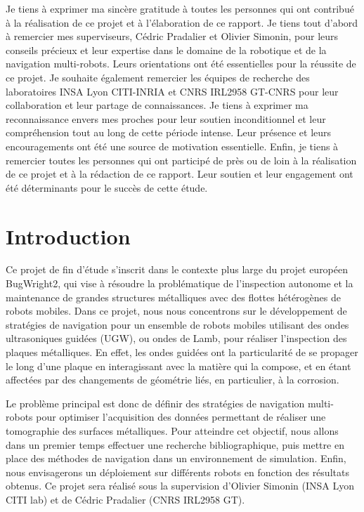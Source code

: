 \documentclass[francais,RandD]{rapportPFE}
\begin{document}
	\begin{remerciements}
		Je tiens à exprimer ma sincère gratitude à toutes les personnes qui ont contribué à la réalisation de ce projet et à l'élaboration de ce rapport.
		Je tiens tout d'abord à remercier mes superviseurs, Cédric Pradalier et Olivier Simonin, pour leurs conseils précieux et leur expertise dans le domaine de la robotique et de la navigation multi-robots. Leurs orientations ont été essentielles pour la réussite de ce projet.
		Je souhaite également remercier les équipes de recherche des laboratoires INSA Lyon CITI-INRIA et CNRS IRL2958 GT-CNRS pour leur collaboration et leur partage de connaissances.
		Je tiens à exprimer ma reconnaissance envers mes proches pour leur soutien inconditionnel et leur compréhension tout au long de cette période intense.
		Leur présence et leurs encouragements ont été une source de motivation essentielle.
		Enfin, je tiens à remercier toutes les personnes qui ont participé de près ou de loin à la réalisation de ce projet et à la rédaction de ce rapport.
		Leur soutien et leur engagement ont été déterminants pour le succès de cette étude.
	\end{remerciements}
	\setcounter{tocdepth}{3}
	\tableofcontents
	\cleardoublepage
	\section{Introduction}
		Ce projet de fin d'étude s'inscrit dans le contexte plus large du projet européen BugWright2, qui vise à résoudre la problématique de l'inspection autonome et la maintenance de grandes structures métalliques avec des flottes hétérogènes de robots mobiles.
		Dans ce projet, nous nous concentrons sur le développement de stratégies de navigation pour un ensemble de robots mobiles utilisant des ondes ultrasoniques guidées (UGW), ou ondes de Lamb, pour réaliser l'inspection des plaques métalliques.
		En effet, les ondes guidées ont la particularité de se propager le long d'une plaque en interagissant avec la matière qui la compose, et en étant affectées par des changements de géométrie liés, en particulier, à la corrosion.

		Le problème principal est donc de définir des stratégies de navigation multi-robots pour optimiser l'acquisition des données permettant de réaliser une tomographie des surfaces métalliques.
		Pour atteindre cet objectif, nous allons dans un premier temps effectuer une recherche bibliographique, puis mettre en place des méthodes de navigation dans un environnement de simulation.
		Enfin, nous envisagerons un déploiement sur différents robots en fonction des résultats obtenus.
		Ce projet sera réalisé sous la supervision d'Olivier Simonin (INSA Lyon CITI lab) et de Cédric Pradalier (CNRS IRL2958 GT).
\end{document}

